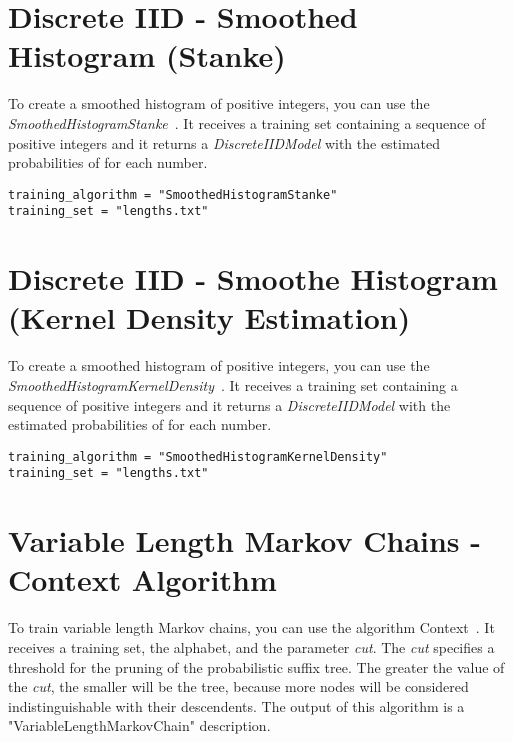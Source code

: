 \section{Discrete IID - Smoothed Histogram (Stanke)}


To create a smoothed histogram of positive integers, you can use the \textit{SmoothedHistogramStanke}~\cite{Stanke2003b}. It receives a training set containing a sequence of positive integers and it returns a \textit{DiscreteIIDModel} with the estimated probabilities of for each number.

\begin{Verbatim}[frame=single, label=train.txt]
training_algorithm = "SmoothedHistogramStanke"
training_set = "lengths.txt"
\end{Verbatim}


\section{Discrete IID - Smoothe Histogram (Kernel Density Estimation)}

To create a smoothed histogram of positive integers, you can use the \textit{SmoothedHistogramKernelDensity}~\cite{Sheather2004}. It receives a training set containing a sequence of positive integers and it returns a \textit{DiscreteIIDModel} with the estimated probabilities of for each number.

\begin{Verbatim}[frame=single, label=train.txt]
training_algorithm = "SmoothedHistogramKernelDensity"
training_set = "lengths.txt"
\end{Verbatim}

\section{Variable Length Markov Chains - Context Algorithm}

To train variable length Markov chains, you can use the algorithm Context~\cite{Rissanen1983,Galves2008}. It receives a training set, the alphabet, and the parameter \textit{cut}. The \textit{cut} specifies a threshold for the pruning of the probabilistic suffix tree. The greater the value of the \textit{cut}, the smaller will be the tree, because more nodes will be considered indistinguishable with their descendents.   The output of this algorithm is a "VariableLengthMarkovChain" description.

